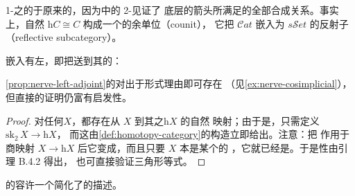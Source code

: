 1-\trCategory{}之\trNerve{}的\trHomotopyCategory\trIsomorphism{}于原来的\trCategory{}，因为\trNerve{}中的 2-\trSimplex{}见证了
底层\trReflexiveDirectedGraph{}的箭头所满足的全部合成关系。事实上，自然\trIsomorphism
$\mathrm{h}C\cong C$ 构成一个\trAdjunction{}的余单位（counit），
它把 $\mathcal{C}at$ 嵌入为 $s\mathcal{S}et$ 的反射子\trCategory
（reflective subcategory）。

\begin{proposition}\label{prop:nerve-left-adjoint}
\trNerve{}嵌入有左\trAdjunction{}，即把\trSimplicialSet{}送到其\trHomotopyCategory{}的\trFunctor{}：
\begin{center}
\end{center}
\end{proposition}

\cref{prop:nerve-left-adjoint}的\trAdjunction{}对出于形式理由即可存在
（见\cref{ex:nerve-cosimplicial}），但直接的证明仍富有启发性。

\begin{proof}
对任何\trSimplicialSet $X$，都存在从 $X$ 到其\trHomotopyCategory{}之\trNerve $\mathrm{h}X$ 的自然
映射；由于\trNerve{}是\trTwoCoskeletal{}，只需定义 $\mathrm{sk}_2\,X\to\mathrm{h}X$，
而这由\cref{def:homotopy-category}的构造立即给出。注意：把\trHomotopyCategory\trFunctor
作用于商映射 $X\to\mathrm{h}X$ 后它变成\trIsomorphism{}，而且只要 $X$ 本是某个\trCategory{}的%
\trNerve{}，它就已经是\trIsomorphism{}。于是\trAdjunction{}性由引理 B.4.2 得出，%
也可直接验证三角形等式。
\end{proof}

\trQuasiCategory{}的\trHomotopyCategory{}容许一个简化了的描述。

